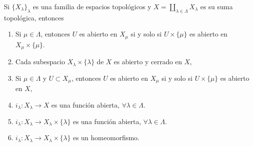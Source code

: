 
\begin{theorem}
Si $\{ X_{\lambda} \}_{\lambda}$ es una familia de espacios topológicos y $X = \coprod_{\lambda \in \Lambda} X_{\lambda}$ es su suma topológica, entonces
\begin{enumerate}[label=\textnormal{(\roman*)}, align=left, labelwidth=1.7em, leftmargin=3.0em]
\item Si $\mu \in \Lambda$, entonces $U$ es abierto en $X_{\mu}$ si y solo si $U \times \{ \mu \}$ es abierto en $X_{\mu} \times \{ \mu \}$.
\item Cada subespacio $X_{\lambda} \times \{ \lambda \}$ de $X$ es abierto y cerrado en $X$,
\item Si $\mu \in \Lambda$ y $U \subset X_{\mu}$, entonces $U$ es abierto en $X_{\mu}$ si y solo si $U \times \{ \mu \}$ es abierto en $X$,
\item $i_{\lambda} : X_{\lambda} \longrightarrow X$ es una función abierta, $\forall \lambda \in \Lambda$.
\item $i_{\lambda} : X_{\lambda} \longrightarrow X_{\lambda} \times \{ \lambda \}$ es una función abierta, $\forall \lambda \in \Lambda$.
\item $i_{\lambda} : X_{\lambda} \longrightarrow X_{\lambda} \times \{ \lambda \}$ es un homeomorfismo.
\end{enumerate}
\end{theorem}

